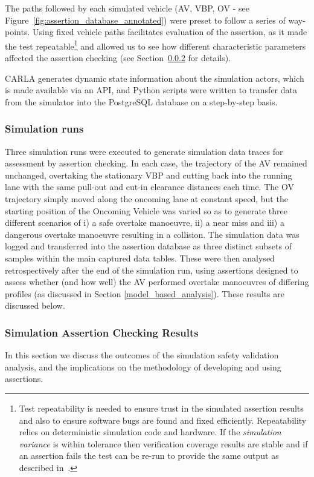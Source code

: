 The paths followed by each simulated vehicle (AV, VBP, OV - see Figure~\ref{fig:assertion_database_annotated}) were preset to follow a series of way-points. Using fixed vehicle paths facilitates evaluation of the assertion, as it made the test repeatable\footnote{Test repeatability is needed to ensure trust in the simulated assertion results and also to ensure software bugs are found and fixed efficiently. Repeatability relies on deterministic simulation code and hardware. If the \emph{simulation variance} is within tolerance then verification coverage results are stable and if an assertion fails the test can be re-run to provide the same output as described in~\cite{chance2021}.} and allowed us to see how different characteristic parameters affected the assertion checking (see Section~\ref{sim_results} for details). 

CARLA generates dynamic state information about the simulation actors, which is made available via an API, and Python scripts were written to transfer data from the simulator into the PostgreSQL database on a step-by-step basis.

\subsubsection{Simulation runs}

Three simulation runs were executed to generate simulation data traces for assessment by assertion checking. In each case, the trajectory of the AV remained unchanged, overtaking the stationary VBP and cutting back into the running lane with the same pull-out and cut-in clearance distances each time. The OV trajectory simply moved along the oncoming lane at constant speed, but the starting position of the Oncoming Vehicle was varied so as to generate three different scenarios of i) a safe overtake manoeuvre, ii) a near miss and iii) a dangerous overtake manoeuvre resulting in a collision. The simulation data was logged and transferred into the assertion database as three distinct subsets of samples within the main captured data tables. These were then analysed retrospectively after the end of the simulation run, using assertions designed to assess whether (and how well) the AV performed overtake manoeuvres of differing profiles (as discussed in Section \ref{model_based_analysis}). These results are discussed below.

\subsubsection{Simulation Assertion Checking Results} \label{sim_results}
In this section we discuss the outcomes of the simulation safety validation analysis, and the implications on the methodology of developing and using assertions.

